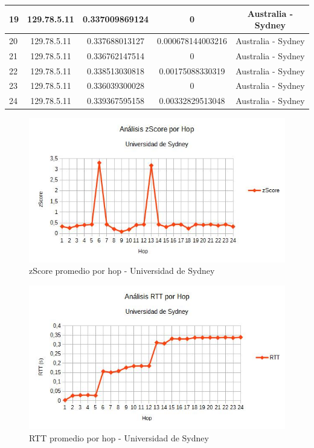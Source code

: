 \begin{tabular}{ | l | c | c | c | c |}
  \hline
  19  &  129.78.5.11  &  0.337009869124  &  0 & Australia - Sydney\\
  \hline
  20  &  129.78.5.11  &  0.337688013127  &  0.000678144003216 & Australia - Sydney\\
  \hline
  21  &  129.78.5.11  &  0.336762147514  &  0 & Australia - Sydney\\
  \hline
  22  &  129.78.5.11  &  0.338513030818  &  0.00175088330319 & Australia - Sydney\\
  \hline
  23  &  129.78.5.11  &  0.336039300028  &  0 & Australia - Sydney\\
  \hline
  24  &  129.78.5.11  &  0.339367595158  &  0.00332829513048 & Australia - Sydney\\
  \hline

\end{tabular}

\bigskip

\begin{figure}[H]
\centering
\includegraphics[width=1\textwidth]{graficos/zScore_Australia.jpg}
\caption{zScore promedio por hop - Universidad de Sydney}
\label{Australia_zs}
\end{figure}

\begin{figure}[H]
\centering
\includegraphics[width=1\textwidth]{graficos/rTT_Australia.jpg}
\caption{RTT promedio por hop - Universidad de Sydney}
\label{Australia_rtt}
\end{figure}

